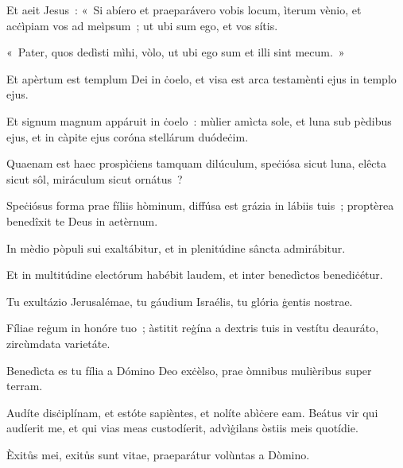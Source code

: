 Et aeit Jesus~: «~Si abíero et praeparávero vobis locum, ìterum vènio, et acċìpiam vos ad meìpsum~; ut ubi sum ego, et vos sítis. 

«~Pater, quos dedìsti mìhi, vòlo, ut ubi ego sum et illi sint mecum.~» 

Et apèrtum est templum Dei in ċoelo, et visa est arca testamènti ejus in templo ejus. 

\mysteryEnd
{}

Et signum magnum appáruit in ċoelo~: mùlier amìcta sole, et luna sub pèdibus ejus, et in càpite ejus coróna stellárum duódeċim. 

Quaenam est haec prospìċiens tamquam dilúculum, speċiósa sicut luna, elêcta sicut sôl, miráculum sicut ornátus~? 

Speċiósus forma prae fíliis hòminum, diffúsa est grázia in lábiis tuis~; proptèrea benedîxit te Deus in aetèrnum. 

In mèdio pòpuli sui exaltábitur, et in plenitúdine sâncta admirábitur. 

Et in multitúdine electórum habébit laudem, et inter benedìctos benediċétur. 

Tu exultázio Jerusalémae, tu gáudium Israélis, tu glória ġentis nostrae. 

Fíliae reġum in honóre tuo~; àstitit reġína a dextris tuis in vestítu deauráto, zircùmdata varietáte. 

Benedìcta es tu fília a Dómino Deo exċèlso, prae òmnibus mulièribus super terram. 

Audíte disċiplínam, et estóte sapièntes, et nolíte abìċere eam. Beátus vir qui audíerit me, et qui vias meas custodíerit, advìġilans òstiis meis quotídie. 

Èxitůs mei, exitůs sunt vitae, praeparátur volùntas a Dòmino. 

\mysteryEnd
